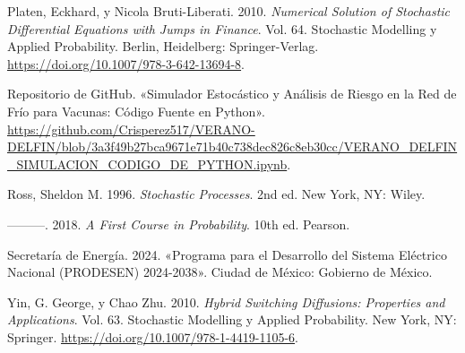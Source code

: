 \documentclass[
  spanish,
  letterpaper,
  DIV=11,
  numbers=noendperiod]{scrreprt}
\newlength{\cslhangindent}
\newenvironment{CSLReferences}[2] %
 {\begin{list}{}{%
  \setlength{\itemindent}{0pt}
  \setlength{\leftmargin}{0pt}
  \setlength{\parsep}{0pt}
  \ifodd #1
   \setlength{\leftmargin}{\cslhangindent}
   \setlength{\itemindent}{-1\cslhangindent}
  \fi
  \setlength{\itemsep}{#2\baselineskip}}}
 {\end{list}}
\theoremstyle{plain}
\theoremstyle{definition}
\theoremstyle{remark}
\begin{document}
\begin{CSLReferences}{1}{0}
Platen, Eckhard, y Nicola Bruti-Liberati. 2010. \emph{Numerical Solution
of Stochastic Differential Equations with Jumps in Finance}. Vol. 64.
Stochastic Modelling y Applied Probability. Berlin, Heidelberg:
Springer-Verlag. \url{https://doi.org/10.1007/978-3-642-13694-8}.

Repositorio de GitHub. {«Simulador Estocástico y Análisis de Riesgo en
la Red de Frío para Vacunas: Código Fuente en Python»}.
\url{https://github.com/Crisperez517/VERANO-DELFIN/blob/3a3f49b27bca9671e71b40c738dec826c8eb30cc/VERANO_DELFIN_SIMULACION_CODIGO_DE_PYTHON.ipynb}.

Ross, Sheldon M. 1996. \emph{Stochastic Processes}. 2nd ed. New York,
NY: Wiley.

---------. 2018. \emph{A First Course in Probability}. 10th ed. Pearson.

Secretaría de Energía. 2024. {«Programa para el Desarrollo del Sistema
Eléctrico Nacional (PRODESEN) 2024-2038»}. Ciudad de México: Gobierno de
México.

Yin, G. George, y Chao Zhu. 2010. \emph{Hybrid Switching Diffusions:
Properties and Applications}. Vol. 63. Stochastic Modelling y Applied
Probability. New York, NY: Springer.
\url{https://doi.org/10.1007/978-1-4419-1105-6}.

\end{CSLReferences}
\end{document}
